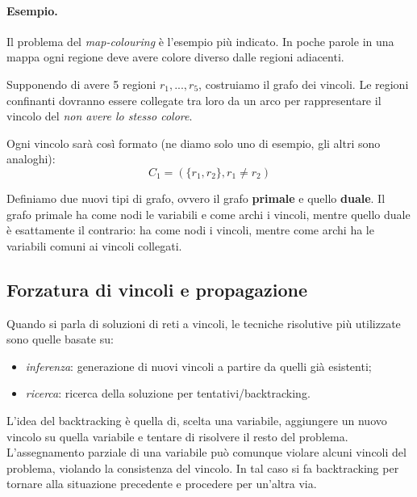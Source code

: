 \documentclass[a4paper, 11pt]{article}
\begin{document}
\paragraph{Esempio.}
Il problema del \textit{map-colouring} è l'esempio più indicato. In poche parole in una mappa ogni regione deve avere colore diverso dalle regioni adiacenti.

Supponendo di avere 5 regioni $r_1, ..., r_5$, costruiamo il grafo dei vincoli. Le regioni confinanti dovranno essere collegate tra loro da un arco per rappresentare il vincolo del \textit{non avere lo stesso colore}.

Ogni vincolo sarà così formato (ne diamo solo uno di esempio, gli altri sono analoghi): \[ C_1 = (\lbrace r_1, r_2 \rbrace, r_1 \neq r_2) \]

\begin{center}
\end{center}


Definiamo due nuovi tipi di grafo, ovvero il grafo \textbf{primale} e quello \textbf{duale}.
Il grafo primale ha come nodi le variabili e come archi i vincoli, mentre quello duale è esattamente il contrario: ha come nodi i vincoli, mentre come archi ha le variabili comuni ai vincoli collegati.

\subsection{Forzatura di vincoli e propagazione}
Quando si parla di soluzioni di reti a vincoli, le tecniche risolutive più utilizzate sono quelle basate su: \begin{itemize}
	\item \textit{inferenza}: generazione di nuovi vincoli a partire da quelli già esistenti;
	\item \textit{ricerca}: ricerca della soluzione per tentativi/backtracking.
\end{itemize}

L'idea del backtracking è quella di, scelta una variabile, aggiungere un nuovo vincolo su quella variabile e tentare di risolvere il resto del problema. L'assegnamento parziale di una variabile può comunque violare alcuni vincoli del problema, violando la consistenza del vincolo. In tal caso si fa backtracking per tornare alla situazione precedente e procedere per un'altra via.
\end{document}
